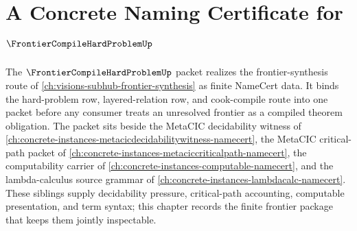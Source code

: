 \chapter{A Concrete Naming Certificate for $\FrontierCompileHardProblemUp$}
\label{ch:concrete-instances-frontier-compile-hard-problem-namecert}

The $\FrontierCompileHardProblemUp$ packet realizes the frontier-synthesis route of \autoref{ch:visions-subhub-frontier-synthesis} as finite NameCert data. It binds the hard-problem row, layered-relation row, and cook-compile route into one packet before any consumer treats an unresolved frontier as a compiled theorem obligation. The packet sits beside the MetaCIC decidability witness of \autoref{ch:concrete-instances-metacicdecidabilitywitness-namecert}, the MetaCIC critical-path packet of \autoref{ch:concrete-instances-metaciccriticalpath-namecert}, the computability carrier of \autoref{ch:concrete-instances-computable-namecert}, and the lambda-calculus source grammar of \autoref{ch:concrete-instances-lambdacalc-namecert}. These siblings supply decidability pressure, critical-path accounting, computable presentation, and term syntax; this chapter records the finite frontier package that keeps them jointly inspectable.



